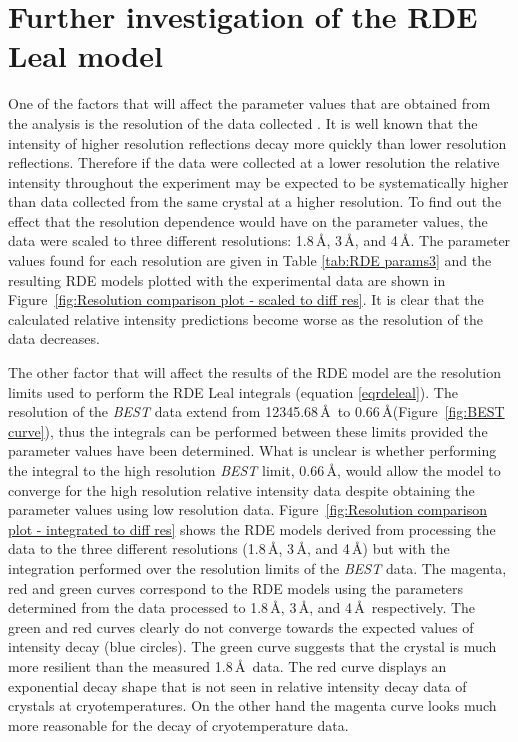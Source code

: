 \section{Further investigation of the RDE Leal model}
\label{sec:Further investigation of the RDE Leal model}

One of the factors that will affect the parameter values that are obtained from the analysis is the resolution of the data collected \cite{leal2012}.
It is well known that the intensity of higher resolution reflections decay more quickly than lower resolution reflections.
Therefore if the data were collected at a lower resolution the relative intensity throughout the experiment may be expected to be systematically higher than data collected from the same crystal at a higher resolution.
To find out the effect that the resolution dependence would have on the parameter values, the data were scaled to three different resolutions: 1.8\,\AA, 3\,\AA, and 4\,\AA.
The parameter values found for each resolution are given in Table \ref{tab:RDE params3} and the resulting RDE models plotted with the experimental data are shown in Figure~\ref{fig:Resolution comparison plot - scaled to diff res}.
It is clear that the calculated relative intensity predictions become worse as the resolution of the data decreases.

The other factor that will affect the results of the RDE model are the resolution limits used to perform the RDE Leal integrals (equation \ref{eqrdeleal}).
The resolution of the \textit{BEST} data extend from 12345.68\,\AA\ to 0.66\,\AA (Figure~\ref{fig:BEST curve}), thus the integrals can be performed between these limits provided the parameter values have been determined.
What is unclear is whether performing the integral to the high resolution \textit{BEST} limit, 0.66\,\AA, would allow the model to converge for the high resolution relative intensity data despite obtaining the parameter values using low resolution data.
Figure~\ref{fig:Resolution comparison plot - integrated to diff res} shows the RDE models derived from processing the data to the three different resolutions (1.8\,\AA, 3\,\AA, and 4\,\AA) but with the integration performed over the resolution limits of the \textit{BEST} data.
The magenta, red and green curves correspond to the RDE models using the parameters determined from the data processed to 1.8\,\AA, 3\,\AA, and 4\,\AA\ respectively.
The green and red curves clearly do not converge towards the expected values of intensity decay (blue circles).
The green curve suggests that the crystal is much more resilient than the measured 1.8$\,$\AA\ data.
The red curve displays an exponential decay shape that is not seen in relative intensity decay data of crystals at cryotemperatures.
On the other hand the magenta curve looks much more reasonable for the decay of cryotemperature data.


